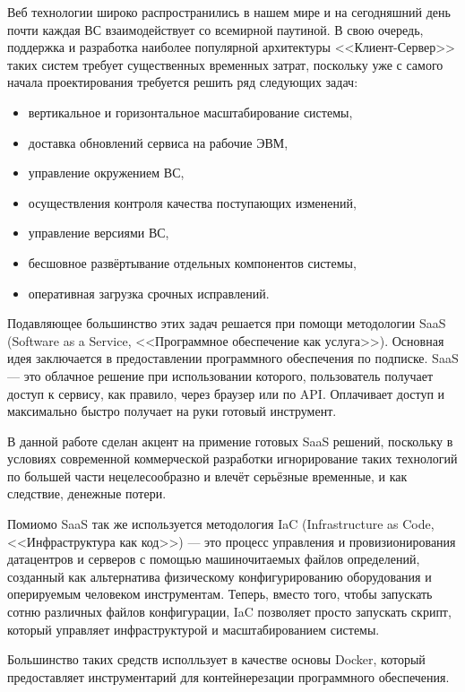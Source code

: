 \Introduction

Веб технологии широко распространились в нашем мире и на сегодняшний день почти каждая ВС взаимодействует со всемирной паутиной.
В свою очередь, поддержка и разработка наиболее популярной архитектуры <<Клиент-Сервер>> таких систем требует существенных временных затрат, поскольку уже с самого начала проектирования требуется решить ряд следующих задач:

\begin{itemize}
    \item вертикальное и горизонтальное масштабирование системы,
    \item доставка обновлений сервиса на рабочие ЭВМ,
    \item управление окружением ВС,
    \item осуществления контроля качества поступающих изменений,
    \item управление версиями ВС,
    \item бесшовное развёртывание отдельных компонентов системы,
    \item оперативная загрузка срочных исправлений.
\end{itemize}

Подавляющее большинство этих задач решается при помощи методологии SaaS (Software as a Service, <<Программное обеспечение как услуга>>).
Основная идея заключается в предоставлении программного обеспечения по подписке.
SaaS --- это облачное решение при использовании которого, пользователь получает доступ к сервису, как правило, через браузер или по API.
Оплачивает доступ и максимально быстро получает на руки готовый инструмент.

В данной работе сделан акцент на примение готовых SaaS решений, поскольку в условиях современной коммерческой разработки игнорирование таких
технологий по большей части нецелесообразно и влечёт серьёзные временные, и как следствие, денежные потери.

Помиомо SaaS так же используется методология IaC (Infrastructure as Code, <<Инфраструктура как код>>) --- это процесс управления и провизионирования датацентров и серверов с помощью машиночитаемых файлов определений,
созданный как альтернатива физическому конфигурированию оборудования и оперируемым человеком инструментам.
Теперь, вместо того, чтобы запускать сотню различных файлов конфигурации,
IaC позволяет просто запускать скрипт, который управляет инфраструктурой и масштабированием системы.

Большинство таких средств исполльзует в качестве основы Docker, который предоставляет инструментарий для контейнерезации программного обеспечения.

